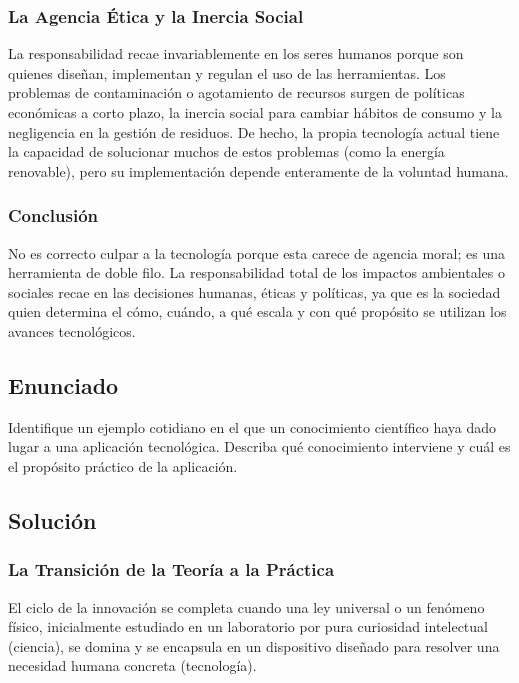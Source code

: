 \documentclass[12pt, a4paper]{article}
\begin{document}
\subsubsection*{La Agencia Ética y la Inercia Social}
La responsabilidad recae invariablemente en los seres humanos porque son quienes diseñan, implementan y regulan el uso de las herramientas. Los problemas de contaminación o agotamiento de recursos surgen de políticas económicas a corto plazo, la inercia social para cambiar hábitos de consumo y la negligencia en la gestión de residuos. De hecho, la propia tecnología actual tiene la capacidad de solucionar muchos de estos problemas (como la energía renovable), pero su implementación depende enteramente de la voluntad humana.

\subsubsection*{Conclusión}
No es correcto culpar a la tecnología porque esta carece de agencia moral; es una herramienta de doble filo. La responsabilidad total de los impactos ambientales o sociales recae en las decisiones humanas, éticas y políticas, ya que es la sociedad quien determina el cómo, cuándo, a qué escala y con qué propósito se utilizan los avances tecnológicos.

\newpage

\subsection*{Enunciado}
Identifique un ejemplo cotidiano en el que un conocimiento científico haya dado lugar a una aplicación tecnológica. Describa qué conocimiento interviene y cuál es el propósito práctico de la aplicación.

\subsection*{Solución}

\subsubsection*{La Transición de la Teoría a la Práctica}
El ciclo de la innovación se completa cuando una ley universal o un fenómeno físico, inicialmente estudiado en un laboratorio por pura curiosidad intelectual (ciencia), se domina y se encapsula en un dispositivo diseñado para resolver una necesidad humana concreta (tecnología). 
\end{document}

